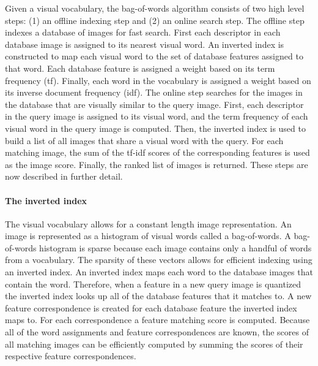         Given a visual vocabulary, the bag-of-words algorithm consists of two high level steps: (1) an offline
        indexing step and (2) an online search step. The offline step indexes a database of images for fast search.
        First each descriptor in each database image is assigned to its nearest visual word. An inverted index is
        constructed to map each visual word to the set of database features assigned to that word. Each database
        feature is assigned a weight based on its term frequency (tf). Finally, each word in the vocabulary is
        assigned a weight based on its inverse document frequency (idf). The online step searches for the images in
        the database that are visually similar to the query image. First, each descriptor in the query image is
        assigned to its visual word, and the term frequency of each visual word in the query image is computed.
        Then, the inverted index is used to build a list of all images that share a visual word with the query. For
        each matching image, the sum of the tf-idf scores of the corresponding features is used as the image score.
        Finally, the ranked list of images is returned. These steps are now described in further detail.


        \paragraph{The inverted index}
            The visual vocabulary allows for a constant length image representation. An image is represented as a
            histogram of visual words called a bag-of-words. A bag-of-words histogram is sparse because each image
            contains only a handful of words from a vocabulary. The sparsity of these vectors allows for efficient
            indexing using an inverted index. An inverted index maps each word to the database images that contain
            the word. Therefore, when a feature in a new query image is quantized the inverted index looks up all
            of the database features that it matches to. A new feature correspondence is created for each database
            feature the inverted index maps to. For each correspondence a feature matching score is computed.
            Because all of the word assignments and feature correspondences are known, the scores of all matching
            images can be efficiently computed by summing the scores of their respective feature correspondences.

